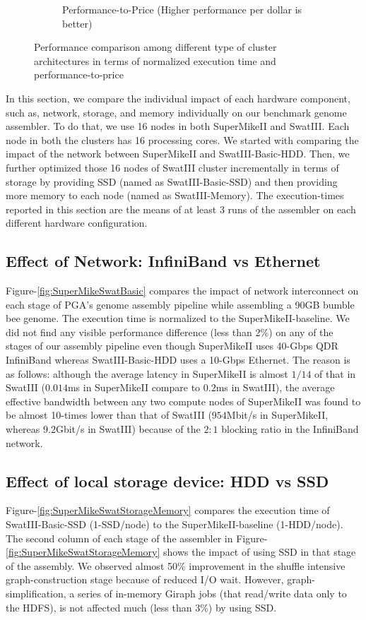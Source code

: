 \documentclass[conference]{IEEEtran}
\begin{document}
\begin{figure}[htb]
\begin{subfigure}[b]{0.5\textwidth}
                \caption{Performance-to-Price (Higher performance per dollar is better)}
                \label{fig:DifferentArchitecturesPerfPerDollar}
        \end{subfigure}
        \caption{Performance comparison among different type of cluster architectures in terms of normalized execution time and performance-to-price}
  \label{fig:DifferentArchitectures}
  \vspace{-1em}
\end{figure}
In this section, we compare the individual impact of each hardware component, such as, network, storage, and memory individually on our benchmark genome assembler. To do that, we use 16 nodes in both SuperMikeII and SwatIII. Each node in both the clusters has 16 processing cores. We started with comparing the impact of the network between SuperMikeII and SwatIII-Basic-HDD. Then, we further optimized those 16 nodes of SwatIII cluster incrementally in terms of storage by providing SSD (named as SwatIII-Basic-SSD) and then providing more memory to each node (named as SwatIII-Memory). The execution-times reported in this section are the means of at least 3 runs of the assembler on each different hardware configuration.
\label{IndividualHWEffect}

\subsection {Effect of Network: InfiniBand vs Ethernet} \label{EffectOfNetwork}
Figure-\ref{fig:SuperMikeSwatBasic} compares the impact of network interconnect on each stage of PGA's genome assembly pipeline while assembling a 90GB bumble bee genome. The execution time is normalized to the SuperMikeII-baseline. We did not find any visible performance difference (less than 2\%) on any of the stages of our assembly pipeline even though SuperMikeII uses 40-Gbps QDR InfiniBand whereas SwatIII-Basic-HDD uses a 10-Gbps Ethernet. The reason is as follows: although the average latency in SuperMikeII is almost $1/14$ of that in SwatIII ($0.014$ms in SuperMikeII compare to $0.2$ms in SwatIII), the average effective bandwidth between any two compute nodes of SuperMikeII was found to be almost 10-times lower than that of SwatIII ($954$Mbit/s in SuperMikeII, whereas $9.2$Gbit/s in SwatIII) because of the $2:1$ blocking ratio in the InfiniBand network.  

\subsection {Effect of local storage device: HDD vs SSD} \label{EffectOfSSD}
Figure-\ref{fig:SuperMikeSwatStorageMemory} compares the execution time of SwatIII-Basic-SSD (1-SSD/node) to the SuperMikeII-baseline (1-HDD/node). The second column of each stage of the assembler in Figure-\ref{fig:SuperMikeSwatStorageMemory} shows the impact of using SSD in that stage of the assembly. We observed almost 50\% improvement in the shuffle intensive graph-construction stage because of reduced I/O wait. 
However, graph-simplification, a series of in-memory Giraph jobs (that read/write data only to the HDFS), is not affected much (less than 3\%) by using SSD. 
 
\end{document}
